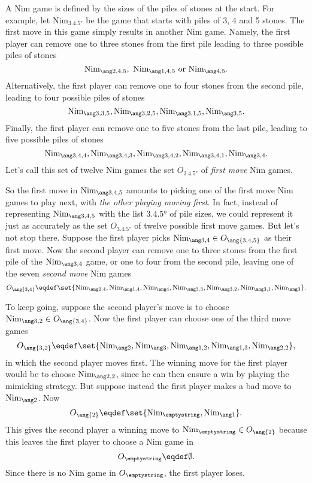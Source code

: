 \begin{definition}
A Nim game is defined by the sizes of the piles of stones at the
start.  For example, let $\text{Nim}_{\ang{3,4,5}}$ be the game that
starts with piles of 3, 4 and 5 stones.  The first move in this game
simply results in another Nim game.  Namely, the first player can
remove one to three stones from the first pile leading to three
possible piles of stones
\begin{equation}\label{nimplay3}
\nimg{2,4,5},\ \nimg{1,4,5}\ \text{or}\ \nimg{4,5}.
\end{equation}
Alternatively, the first player can remove one to four stones from the
second pile, leading to four possible piles of stones
\begin{equation}\label{nimplay4}
\nimg{3,3,5},\nimg{3,2,5},\nimg{3,1,5},\nimg{3,5}.
\end{equation}
Finally, the first player can remove one to five stones from the
last pile, leading to five possible piles of stones
\begin{equation}\label{nimplay5}
\nimg{3,4,4}, \nimg{3,4,3}, \nimg{3,4,2}, \nimg{3,4,1}, \nimg{3,4}.
\end{equation}
Let's call this set of twelve Nim games the set $O_{\ang{3,4,5}}$ of
\emph{first move} Nim games.

So the first move in $\nimg{3,4,5}$ amounts to picking one of the
first move Nim games to play next, with \emph{the other playing moving
  first}.  In fact, instead of representing $\nimg{3,4,5}$ with the
list $\ang{3,4,5}$ of pile sizes, we could represent it just as
accurately as the set $O_{\ang{3,4,5}}$ of twelve possible first move
games.  But let's not stop there.  Suppose the first player picks
$\nimg{3,4} \in O_{\ang{3,4,5}}$ as their first move.  Now the second
player can remove one to three stones from the first pile of the
$\nimg{3,4}$ game, or one to four from the second pile, leaving one of
  the seven \emph{second move} Nim games
\[
O_{\ang{3,4}} \eqdef \set{\nimg{2,4}, \nimg{1,4}, \nimg{4}, \nimg{3,3},
  \nimg{3,2}, \nimg{3,1}, \nimg{3}}.
\]

To keep going, suppose the second player's move is to choose $\nimg{3,2}
\in O_{\ang{3,4}}$.  Now the first player can choose one of the third move games
\[
O_{\ang{3,2}} \eqdef \set{\nimg{2}, \nimg{3}, \nimg{1, 2}, \nimg{1, 3}, \nimg{2, 2}},
\]
in which the second player moves first.  The winning move for the
first player would be to choose $\nimg{2, 2}$, since he can then ensure
a win by playing the mimicking strategy.  But suppose instead the
first player makes a bad move to $\nimg{2}$.  Now
\[
O_{\ang{2}} \eqdef \set{\text{Nim}_{\emptystring}, \nimg{1}}.
\]
This gives the second player a winning move to $\text{Nim}_{\emptystring}
\in O_{\ang{2}}$ because this leaves the first player to choose a Nim
game in
\[
O_{\emptystring} \eqdef \emptyset.
\]
Since there is no Nim game in $O_{\emptystring}$, the first player
loses.


\end{definition}
